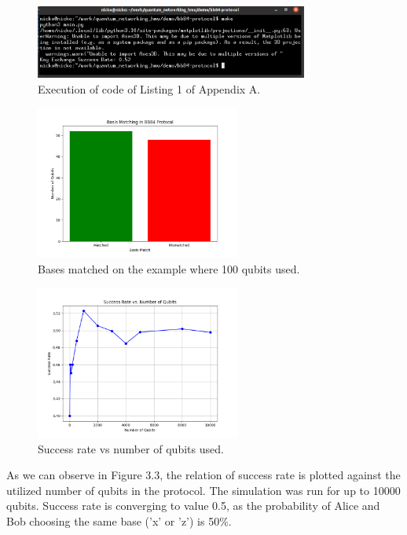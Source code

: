 		\begin{figure}[h!]
			\centering
			\includegraphics[width=0.8\textwidth]{bb84/success_rate_terminal.png}
			\caption{Execution of code of Listing 1 of Appendix A.}
			\label{fig:}
		\end{figure}		

		\begin{figure}[h!]
			\centering
			\includegraphics[width=0.6\textwidth]{bb84/basis_matching.png}
			\caption{Bases matched on the example where 100 qubits used.}
			\label{fig:}
		\end{figure}		


		\begin{figure}[h!]
			\centering
			\includegraphics[width=0.6\textwidth]{bb84/success_rate_vs_num_qubits.png}
			\caption{Success rate vs number of qubits used.}
			\label{fig:}
		\end{figure}		

		As we can observe in Figure 3.3, the relation of success rate is plotted against the utilized 
		number of qubits in the protocol. The simulation was run for up to 10000 qubits. 
		Success rate is converging to value 0.5, as the probability 
		of Alice and Bob choosing the same base ('x' or 'z') is 50\%.


